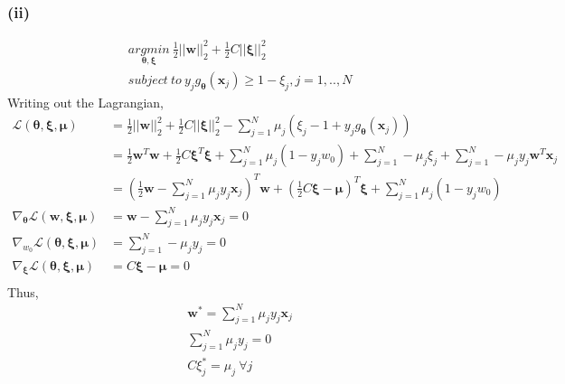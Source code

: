 \documentclass[11pt]{article}
\begin{document}
\subsubsection*{(ii)}
\begin{equation}
\begin{split}
&\underset{\pmb{\theta},\pmb{\xi}}{argmin}\ \frac{1}{2}||\pmb{w}||^2_2 + \frac{1}{2}C||\pmb{\xi}||^2_2\\
&subject\ to\ y_jg_{\pmb{\theta}}(\pmb{x}_j)\ge 1-\xi_j,j=1,..,N
\end{split}
\end{equation}
Writing out the Lagrangian, 
\begin{equation}
\begin{split}
\mathcal{L}(\pmb{\theta}, \pmb{\xi}, \pmb{\mu}) &= \frac{1}{2}||\pmb{w}||^2_2 + \frac{1}{2}C||\pmb{\xi}||^2_2 - \sum_{j=1}^{N}\mu_j(\xi_j-1+y_jg_{\pmb{\theta}}(\pmb{x}_j))\\
&=\frac{1}{2}\pmb{w}^T\pmb{w} + \frac{1}{2}C\pmb{\xi}^T\pmb{\xi} + \sum_{j=1}^{N}\mu_j(1-y_jw_0) + \sum_{j=1}^{N}-\mu_j\xi_j + \sum_{j=1}^{N}-\mu_jy_j\pmb{w}^T\pmb{x}_j\\
&=(\frac{1}{2}\pmb{w}-\sum_{j=1}^{N}\mu_jy_j\pmb{x}_j)^T\pmb{w} + (\frac{1}{2}C\pmb{\xi}-\pmb{\mu})^T\pmb{\xi} + \sum_{j=1}^{N}\mu_j(1-y_jw_0)\\
\nabla_{\pmb{\theta}}\mathcal{L}(\pmb{w}, \pmb{\xi}, \pmb{\mu}) &= \pmb{w}-\sum_{j=1}^{N}\mu_jy_j\pmb{x}_j = 0\\
\nabla_{w_0}\mathcal{L}(\pmb{\theta}, \pmb{\xi}, \pmb{\mu}) &=\sum_{j=1}^{N}-\mu_j y_j=0\\
\nabla_{\pmb{\xi}}\mathcal{L}(\pmb{\theta}, \pmb{\xi}, \pmb{\mu}) &= C\pmb{\xi}-\pmb{\mu} = 0\\
\end{split}
\end{equation}
Thus,
\begin{equation}
\begin{split}
&\pmb{w}^*=\sum_{j=1}^{N}\mu_jy_j\pmb{x}_j\\
&\sum_{j=1}^{N}\mu_jy_j = 0\\
&C\xi_j^*= \mu_j\ \forall j\\
\end{split}
\end{equation}
\end{document}
